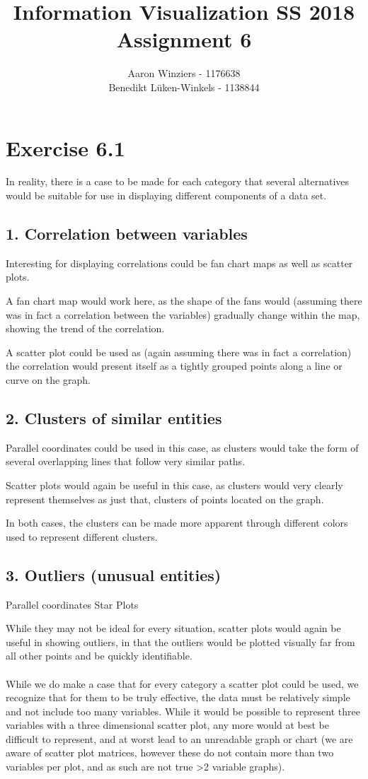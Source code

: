 \documentclass[10pt,a4paper,parskip=quarter ]{article}
\author{Aaron Winziers - 1176638 \\
Benedikt Lüken-Winkels - 1138844}
\title{Information Visualization SS 2018\\\LARGE{Assignment 6}}
\begin{document}
	\maketitle
	\section*{Exercise 6.1}
	
	In reality, there is a case to be made for each category that several alternatives would be suitable for use in displaying different components of a data set. 
	
	\subsection*{1. Correlation between variables}
		Interesting for displaying correlations could be fan chart maps as well as scatter plots.
		
		A fan chart map would work here, as the shape of the fans would (assuming there was in fact a correlation between the variables) gradually change within the map, showing the trend of the correlation.
		
		A scatter plot could be used as (again assuming there was in fact a correlation) the correlation would present itself as a tightly grouped points along a line or curve on the graph.
			
	\subsection*{2. Clusters of similar entities}
		Parallel coordinates could be used in this case, as clusters would take the form of several overlapping lines that follow very similar paths.
		
		Scatter plots would again be useful in this case, as clusters would very clearly represent themselves as just that, clusters of points located on the graph.
		
		In both cases, the clusters can be made more apparent through different colors used to represent different clusters.
		
	\subsection*{3. Outliers (unusual entities)}
		Parallel coordinates
		Star Plots
		
		While they may not be ideal for every situation, scatter plots would again be useful in showing outliers, in that the outliers would be plotted visually far from all other points and be quickly identifiable.
	\\ \\
	
	While we do make a case that for every category a scatter plot could be used, we recognize that for them to be truly effective, the data must be relatively simple and not include too many variables. While it would be possible to represent three variables with a three dimensional scatter plot, any more would at best be difficult to represent, and at worst lead to an unreadable graph or chart (we are aware of scatter plot matrices, however these do not contain more than two variables per plot, and as such are not true >2 variable graphs).
\end{document}
